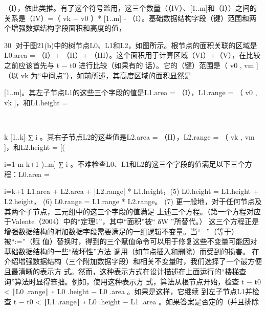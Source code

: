 （I），依此类推。有了这个符号滥用，这三个数量（（IV）、[1..m]和（I））之间的关系是（IV）=（
 vk − v0 ）* [1..m] - （I）。基础数据结构字段（键）范围和两个增强数据结构字段面积和高度的值，
      ​               ​




                                                                                                                      30
对于图21(b)中的树节点L0、L1和L2，如图所示。根节点的面积关联的区域是L0.area = （I）+ （II）+
（III）。这个面积用于计算区域（VI）+（V），在比较之前应该首先与 t − t0 进行比较（如果有的
话）。它的（键）范围是（ v0 , vm ]（以 vk 为“中间点”），如前所述，其高度区域的面积显然是
                                                                        ​




[1..m]。其左子节点L1的这些三个字段的值是L1.area = （I），L1.range = （ v0 , vk ]，和L1.height =
                             ​   ​               ​




                                                                                ​       ​




       k
[1..k] ∑ i 。其右子节点L2的这些值是L2.area = （II），L2.range = （ vk , vm ]，和L2.height = [(
            ​                                                               ​       ​




      i=1
                m
k+1     )..m] ∑ i 。不难检查L0、L1和L2的这三个字段的值满足以下三个方程：L0.area =
                    ​




              i=k+1
L1.area + L2.area + |L2.range| * L1.height，(5) L0.height = L1.height + L2.height， (6) L0.range =
L1.range * L2.range。 (7) 更一般地，对于任何节点及其两个子节点，三元组中的这三个字段的值满足
上述三个方程。（第一个方程对应于Valente（2004）中的“定理1”，其中“面积”被“ δW ”所替代。）
这三个方程正是增强数据结构的附加数据字段需要满足的一组逻辑不变量。当“=”（等于）被“:=”（赋
值）替换时，得到的三个赋值命令可以用于修复这些不变量可能因对基础数据结构的一些“破坏性”方法
调用（如节点插入和删除）而受到的损害。
在介绍增强数据结构（三个附加数据字段）和相关不变量时，我们选择了一个最方便且最清晰的表示方
式。然而，这种表示方式在设计描述在上面运行的“楼梯查询”算法时显得笨拙。例如，使用这种表示方
式，算法从根节点开始，检查 t − t0 < ∣L0 .range∣ ∗ L0 .height − L0 .area 。如果是这样，它继续
到左子节点L1并检查 t − t0 < ∣L1 .range∣ ∗ L0 .height − L1 .area 。如果答案是否定的（并且排除
                                         ​   ​           ​          ​




